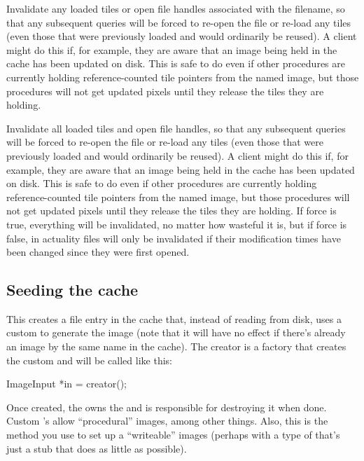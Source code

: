 Invalidate any loaded tiles or open file handles associated with
the filename, so that any subsequent queries will be forced to
re-open the file or re-load any tiles (even those that were
previously loaded and would ordinarily be reused).  A client
might do this if, for example, they are aware that an image
being held in the cache has been updated on disk.  This is safe
to do even if other procedures are currently holding 
reference-counted tile pointers from the named image, but those 
procedures will not get updated pixels until they release the 
tiles they are holding.
\apiend

Invalidate all loaded tiles and open file handles, so that any
subsequent queries will be forced to re-open the file or re-load any
tiles (even those that were previously loaded and would ordinarily be
reused).  A client might do this if, for example, they are aware that an
image being held in the cache has been updated on disk.  This is safe to
do even if other procedures are currently holding reference-counted tile
pointers from the named image, but those procedures will not get updated
pixels until they release the tiles they are holding.  If force is true,
everything will be invalidated, no matter how wasteful it is, but if
force is false, in actuality files will only be invalidated if their
modification times have been changed since they were first opened.
\apiend

\subsection{Seeding the cache}
\label{sec:imagecache:api:seeding}
\NEW  %
This creates a file entry in the cache that, instead of reading
from disk, uses a custom \ImageInput to generate the image (note
that it will have no effect if there's already an image by the
same name in the cache).  The {\cf creator} is a factory that
creates the custom \ImageInput and will be called like this:
\begin{code}
    ImageInput *in = creator();
\end{code}

Once created, the \ImageCache owns
the \ImageInput and is responsible for destroying it when done.
Custom \ImageInput's allow ``procedural'' images, among other
things.  Also, this is the method you use to set up a
``writeable'' \ImageCache images (perhaps with a type of \ImageInput
that's just a stub that does as little as possible).
\apiend

